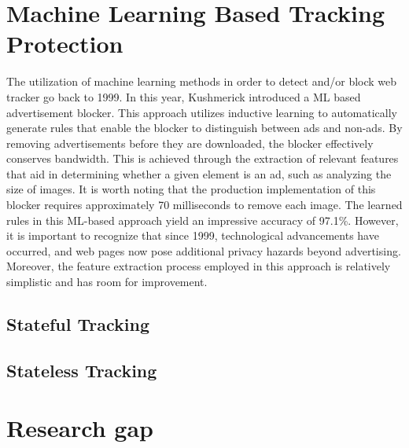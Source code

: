 \section{Machine Learning Based Tracking Protection}

The utilization of machine learning methods in order to detect and/or block web tracker go back to 1999. In this year, Kushmerick \cite{kushmerick1999learning}
introduced a ML based advertisement blocker. This approach utilizes inductive learning to automatically
generate rules that enable the blocker to distinguish between ads and non-ads. By removing advertisements before they are downloaded,
the blocker effectively conserves bandwidth. This is achieved through the extraction of relevant features that aid in determining
whether a given element is an ad, such as analyzing the size of images. It is worth noting that the production implementation of
this blocker requires approximately 70 milliseconds to remove each image. The learned rules in this ML-based approach yield an
impressive accuracy of 97.1\%. However, it is important to recognize that since 1999, technological advancements have occurred,
and web pages now pose additional privacy hazards beyond advertising. Moreover, the feature extraction process employed in this
approach is relatively simplistic and has room for improvement.
\subsection{Stateful Tracking}
\subsection{Stateless Tracking}

\section{Research gap}

